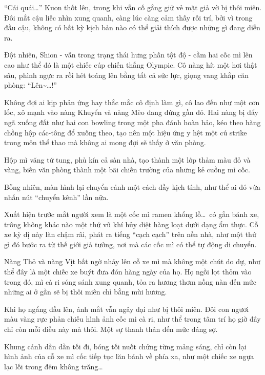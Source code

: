 \documentclass[../main.tex]{subfiles}
\begin{document}
``Cái quái\dots'' Kuon thốt lên, trong khi vẫn cố gắng giữ vẻ mặt giả vờ bị thôi miên. Đôi mắt cậu liếc nhìn xung quanh, càng lúc càng cảm thấy rối trí, bởi vì trong đầu cậu, không có bất kỳ kịch bản nào có thể giải thích được những gì đang diễn ra.

Đột nhiên, Shion - vẫn trong trạng thái hưng phấn tột độ - cầm hai cốc mì lên cao như thể đó là một chiếc cúp chiến thắng Olympic. Cô nàng hít một hơi thật sâu, phình ngực ra rồi hét toáng lên bằng tất cả sức lực, giọng vang khắp căn phòng: ``Lên\~{}\dots!''

Không đợi ai kịp phản ứng hay thắc mắc cô định làm gì, cô lao đến như một cơn lốc, xô mạnh vào nàng Khuyển và nàng Mèo đang đứng gần đó. Hai nàng bị đẩy ngã xuống đất như hai con bowling trong một pha đánh hoàn hảo, kéo theo hàng chồng hộp các-tông đổ xuống theo, tạo nên một hiệu ứng y hệt một cú strike trong môn thể thao mà không ai mong đợi sẽ thấy ở văn phòng.

Hộp mì văng tứ tung, phủ kín cả sàn nhà, tạo thành một lớp thảm màu đỏ và vàng, biến văn phòng thành một bãi chiến trường của những kẻ cuồng mì cốc.

\ct


Bỗng nhiên, màn hình lại chuyển cảnh một cách đầy kịch tính, như thể ai đó vừa nhấn nút ``chuyển kênh'' lần nữa.

Xuất hiện trước mắt người xem là một cốc mì ramen khổng lồ\dots\ có gắn bánh xe, trông không khác nào một thứ vũ khí hủy diệt hàng loạt dưới dạng ẩm thực. Cỗ xe kỳ dị này lăn chậm rãi, phát ra tiếng ``cạch cạch'' trên nền nhà, như một thứ gì đó bước ra từ thế giới giả tưởng, nơi mà các cốc mì có thể tự động di chuyển.

Nàng Thỏ và nàng Vịt bất ngờ nhảy lên cỗ xe mì mà không một chút do dự, như thể đây là một chiếc xe buýt đưa đón hàng ngày của họ. Họ ngồi lọt thỏm vào trong đó, mì cà ri sóng sánh xung quanh, tỏa ra hương thơm nồng nàn đến mức những ai ở gần sẽ bị thôi miên chỉ bằng mùi hương.

Khi họ ngẩng đầu lên, ánh mắt vẫn ngây dại như bị thôi miên. Đôi con ngươi màu vàng rực phản chiếu hình ảnh cốc mì cà ri, như thể trong tâm trí họ giờ đây chỉ còn mỗi điều này mà thôi. Một sự thanh thản đến mức đáng sợ.

Khung cảnh dần dần tối đi, bóng tối nuốt chửng từng mảng sáng, chỉ còn lại hình ảnh của cỗ xe mì cốc tiếp tục lăn bánh về phía xa, như một chiếc xe ngựa lạc lối trong đêm không trăng…
\end{document}
